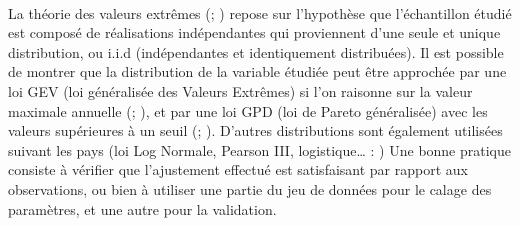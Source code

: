 	
	\paragraph{} La théorie des valeurs extrêmes (\cite{gumbel_statistics_1958}; \cite{coles_classical_2001}) repose sur l'hypothèse que l'échantillon étudié est composé de réalisations indépendantes qui proviennent d'une seule et unique distribution, ou i.i.d (indépendantes et identiquement distribuées). Il est possible de montrer que la distribution de la variable étudiée peut être approchée par une loi GEV (loi généralisée des Valeurs Extrêmes) si l'on raisonne sur la valeur maximale annuelle (\cite{fisher_limiting_1928}; \cite{gnedenko_sur_1943}), et par une loi GPD (loi de Pareto généralisée) avec les valeurs supérieures à un seuil (\cite{balkema_residual_1974}; \cite{pickands_statistical_1975}). D'autres distributions sont également utilisées suivant les pays (loi Log Normale, Pearson III, logistique… : \cite{whs_flood_2008}) Une bonne pratique consiste à vérifier que l'ajustement effectué est satisfaisant par rapport aux observations, ou bien à utiliser une partie du jeu de données pour le calage des paramètres, et une autre pour la validation.
	
